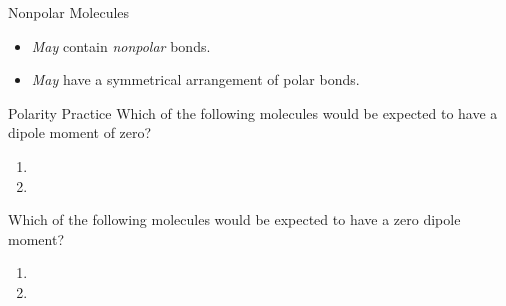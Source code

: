 \documentclass[notes=hide]{beamer}
\begin{document}
\begin{frame}{Nonpolar Molecules}
	\begin{itemize}
		\item \emph{May} contain \emph{nonpolar} bonds.

			\begin{center}
				\hspace{5em}
			\end{center}

		\item \emph{May} have a symmetrical arrangement of polar bonds.

			\bigskip

			\begin{center}
				\hspace{5em}
			\end{center}
	\end{itemize}
\end{frame}

\begin{frame}[t]{Polarity Practice}
	Which of the following molecules would be expected to have a dipole
	moment of zero?

	\begin{enumerate}
		\item {}
		\item {}
	\end{enumerate}
	
	\vspace{8em}
\end{frame}

\begin{onyourown}{8em}
	Which of the following molecules would be expected to have a zero dipole
	moment?

	\begin{enumerate}
		\item {}
		\item {}
	\end{enumerate}
\end{onyourown}
\end{document}
